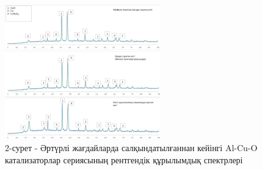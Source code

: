 \begin{figure}[H]
	\centering
	\includegraphics[width=0.6\textwidth]{assets/70}
	\caption*{2-сурет - Әртүрлі жағдайларда салқындатылғаннан кейінгі Al-Cu-O катализаторлар сериясының рентгендік құрылымдық спектрлері}
\end{figure}

